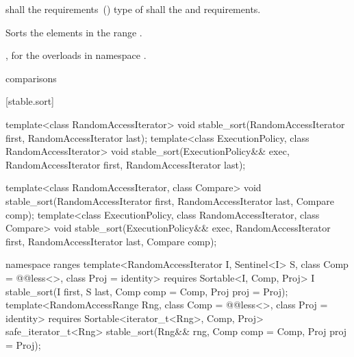 \begin{itemdescr}
\pnum
\requires
{}
 shall  the
 requirements~() type of  shall  the
 and
 requirements.

\pnum
\effects
Sorts the elements in the range
.

\begin{newnewblock}
\pnum
\returns {}, for the overloads in namespace .
\end{newnewblock}

\pnum
\complexity
{} 
comparisons
\end{itemdescr}


[stable.sort]{}

%
\begin{itemdecl}
template<class RandomAccessIterator>
  void stable_sort(RandomAccessIterator first, RandomAccessIterator last);
template<class ExecutionPolicy, class RandomAccessIterator>
  void stable_sort(ExecutionPolicy&& exec,
                   RandomAccessIterator first, RandomAccessIterator last);

template<class RandomAccessIterator, class Compare>
  void stable_sort(RandomAccessIterator first, RandomAccessIterator last,
                   Compare comp);
template<class ExecutionPolicy, class RandomAccessIterator, class Compare>
  void stable_sort(ExecutionPolicy&& exec,
                   RandomAccessIterator first, RandomAccessIterator last,
                   Compare comp);
\end{itemdecl}
\begin{addedblock}
\begin{itemdecl}
namespace ranges {
  template<RandomAccessIterator I, Sentinel<I> S, class Comp = @@less<>,
      class Proj = identity>
    requires Sortable<I, Comp, Proj>
    I stable_sort(I first, S last, Comp comp = Comp{}, Proj proj = Proj{});
  template<RandomAccessRange Rng, class Comp = @@less<>, class Proj = identity>
    requires Sortable<iterator_t<Rng>, Comp, Proj>
    safe_iterator_t<Rng>
      stable_sort(Rng&& rng, Comp comp = Comp{}, Proj proj = Proj{});
}
\end{itemdecl}
\end{addedblock}

